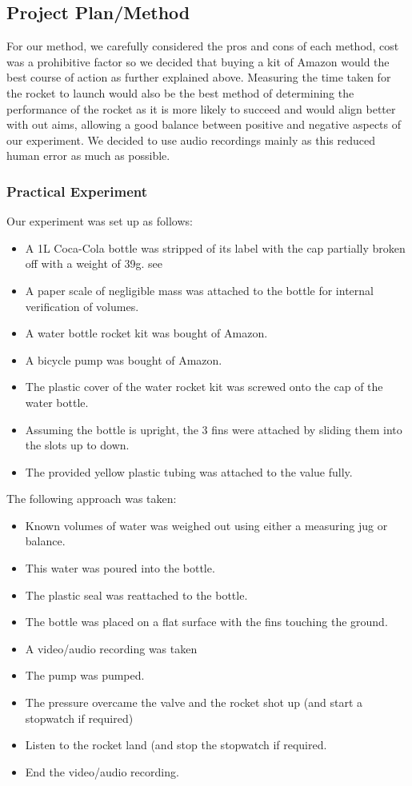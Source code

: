 \documentclass[14pt]{article}
\begin{document}
\subsection{Project Plan/Method}
For our method, we carefully considered the pros and cons of each method, cost was a prohibitive factor so we decided that buying a kit of Amazon would the best course of action as further explained above. Measuring the time taken for the rocket to launch would also be the best method of determining the performance of the rocket as it is more likely to succeed and would align better with out aims, allowing a good balance between positive and negative aspects of our experiment. We decided to use audio recordings mainly as this reduced human error as much as possible. 

\subsubsection{Practical Experiment}
Our experiment was set up as follows:
\begin{itemize}
    \item A 1L Coca-Cola bottle was stripped of its label with the cap partially broken off with a weight of 39g. see \cite{2}
    \item A paper scale of negligible mass was attached to the bottle for internal verification of volumes.
    \item A water bottle rocket kit was bought of Amazon.  \cite{3}
    \item A bicycle pump was bought of Amazon.
    \item The plastic cover of the water rocket kit was screwed onto the cap of the water bottle.
    \item Assuming the bottle is upright, the 3 fins were attached by sliding them into the slots up to down.
    \item The provided yellow plastic tubing was attached to the value fully.
\end{itemize}
The following approach was taken:
\begin{itemize}
    \item Known volumes of water was weighed out using either a measuring jug or balance.
    \item This water was poured into the bottle.
    \item The plastic seal was reattached to the bottle.
    \item The bottle was placed on a flat surface with the fins touching the ground.
    \item A video/audio recording was taken
    \item The pump was pumped.
    \item The pressure overcame the valve and the rocket shot up (and start a stopwatch if required)
    \item Listen to the rocket land (and stop the stopwatch if required.
    \item End the video/audio recording.
\end{itemize}
\end{document}

